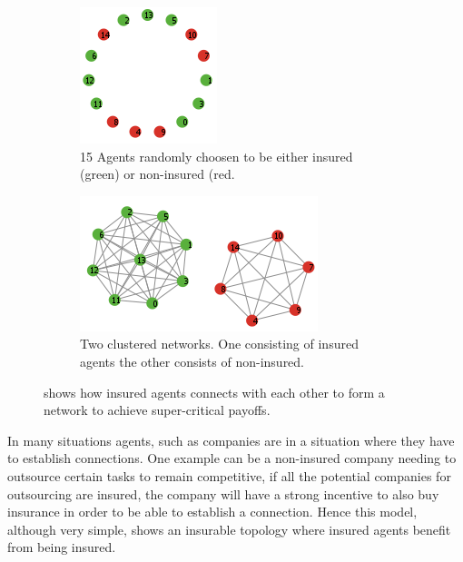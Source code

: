 \begin{figure}[h]
\centering
\begin{subfigure}{.5\textwidth}
  \centering
  \includegraphics[width=0.4\linewidth]{../Figures/firstModelWithNoParameters1.png}
  \caption{\label{fig:firstmod1} 15 Agents randomly choosen to be either insured (green) or non-insured (red.}
\end{subfigure}
\quad
\begin{subfigure}{.46\textwidth}
  \centering
  \includegraphics[width=0.8\linewidth]{../Figures/firstModelWithNoParameters2.png}
  \caption{\label{fig:firstmod2} Two clustered networks. One consisting of insured agents the other consists of non-insured.}
\end{subfigure}
\caption{\label{fig:fincont} shows how insured agents connects with each other to form a network to achieve super-critical payoffs.}
\end{figure}

In many situations agents, such as companies are in a situation where they have to establish connections. One example can be a non-insured company needing to outsource certain tasks to remain competitive, if all the potential companies for outsourcing are insured, the company will have a strong incentive to also buy insurance in order to be able to establish a connection. Hence this model, although very simple, shows an insurable topology where insured agents benefit from being insured. 

